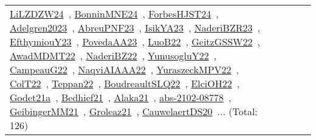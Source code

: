 {\begin{longtable}{lp{3cm}>{\raggedright\arraybackslash}p{6cm}>{\raggedright\arraybackslash}p{6cm}>{\raggedright\arraybackslash}p{8cm}}
\href{../works/LiLZDZW24.pdf}{LiLZDZW24}~\cite{LiLZDZW24}, \href{../works/BonninMNE24.pdf}{BonninMNE24}~\cite{BonninMNE24}, \href{../works/ForbesHJST24.pdf}{ForbesHJST24}~\cite{ForbesHJST24}, \href{../works/Adelgren2023.pdf}{Adelgren2023}~\cite{Adelgren2023}, \href{../works/AbreuPNF23.pdf}{AbreuPNF23}~\cite{AbreuPNF23}, \href{../works/IsikYA23.pdf}{IsikYA23}~\cite{IsikYA23}, \href{../works/NaderiBZR23.pdf}{NaderiBZR23}~\cite{NaderiBZR23}, \href{../works/EfthymiouY23.pdf}{EfthymiouY23}~\cite{EfthymiouY23}, \href{../works/PovedaAA23.pdf}{PovedaAA23}~\cite{PovedaAA23}, \href{../works/LuoB22.pdf}{LuoB22}~\cite{LuoB22}, \href{../works/GeitzGSSW22.pdf}{GeitzGSSW22}~\cite{GeitzGSSW22}, \href{../works/AwadMDMT22.pdf}{AwadMDMT22}~\cite{AwadMDMT22}, \href{../works/NaderiBZ22.pdf}{NaderiBZ22}~\cite{NaderiBZ22}, \href{../works/YunusogluY22.pdf}{YunusogluY22}~\cite{YunusogluY22}, \href{../works/CampeauG22.pdf}{CampeauG22}~\cite{CampeauG22}, \href{../works/NaqviAIAAA22.pdf}{NaqviAIAAA22}~\cite{NaqviAIAAA22}, \href{../works/YuraszeckMPV22.pdf}{YuraszeckMPV22}~\cite{YuraszeckMPV22}, \href{../works/ColT22.pdf}{ColT22}~\cite{ColT22}, \href{../works/Teppan22.pdf}{Teppan22}~\cite{Teppan22}, \href{../works/BoudreaultSLQ22.pdf}{BoudreaultSLQ22}~\cite{BoudreaultSLQ22}, \href{../works/ElciOH22.pdf}{ElciOH22}~\cite{ElciOH22}, \href{../works/Godet21a.pdf}{Godet21a}~\cite{Godet21a}, \href{../works/Bedhief21.pdf}{Bedhief21}~\cite{Bedhief21}, \href{../works/Alaka21.pdf}{Alaka21}~\cite{Alaka21}, \href{../works/abs-2102-08778.pdf}{abs-2102-08778}~\cite{abs-2102-08778}, \href{../works/GeibingerMM21.pdf}{GeibingerMM21}~\cite{GeibingerMM21}, \href{../works/Groleaz21.pdf}{Groleaz21}~\cite{Groleaz21}, \href{../works/CauwelaertDS20.pdf}{CauwelaertDS20}~\cite{CauwelaertDS20}... (Total: 126)\\

\end{longtable}}
